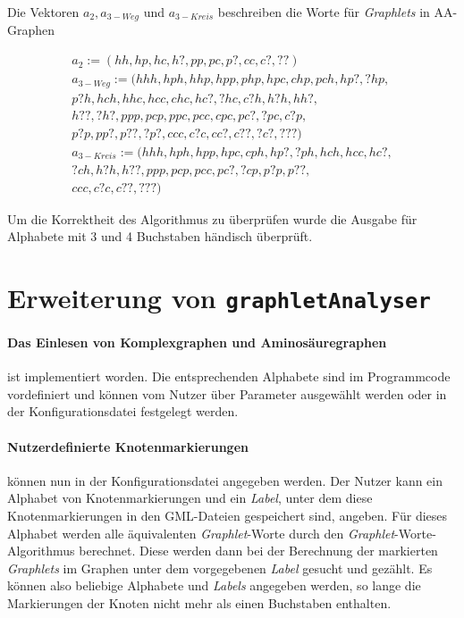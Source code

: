 \documentclass{report}
\begin{document}
Die Vektoren $a_2, a_{3-Weg}$ und $a_{3-Kreis}$ beschreiben die Worte f\"ur \textit{Graphlets} in AA-Graphen 

\begin{subequations}
\begin{align}
a_2 :=         (hh, hp, hc, h?, pp, pc, p?, cc, c?, ??) \\ 
a_{3-Weg} :=   (hhh, hph, hhp, hpp, php, hpc, chp, pch, hp?, ?hp,\\
                p?h, hch, hhc, hcc, chc, hc?, ?hc ,c?h, h?h, hh?, \\
                h??, ?h?, ppp, pcp, ppc, pcc, cpc, pc?, ?pc, c?p, \\
                p?p, pp?, p??, ?p?, ccc, c?c, cc?, c??, ?c?, ???) \\
a_{3-Kreis} := (hhh, hph, hpp, hpc, cph, hp?, ?ph, hch, hcc, hc?, \\
                ?ch, h?h, h??, ppp, pcp, pcc, pc?, ?cp, p?p, p??, \\
                ccc, c?c, c??, ???)
\end{align}
\end{subequations}


Um die Korrektheit des Algorithmus zu \"uberpr\"ufen wurde die Ausgabe f\"ur Alphabete mit 3 und 4 Buchstaben h\"andisch \"uberpr\"uft.



\section{Erweiterung von \texttt{graphletAnalyser}}

\paragraph{Das Einlesen von Komplexgraphen und Aminos\"auregraphen}

ist implementiert worden. Die entsprechenden Alphabete sind im Programmcode vordefiniert und k\"onnen vom Nutzer \"uber Parameter ausgew\"ahlt werden oder in der Konfigurationsdatei festgelegt werden.

\paragraph{Nutzerdefinierte Knotenmarkierungen} k\"onnen nun in der Konfigurationsdatei angegeben werden. Der Nutzer kann ein Alphabet von Knotenmarkierungen und ein \textit{Label}, unter dem diese Knotenmarkierungen in den GML-Dateien gespeichert sind, angeben. F\"ur dieses Alphabet werden alle \"aquivalenten \textit{Graphlet}-Worte durch den \textit{Graphlet}-Worte-Algorithmus berechnet. Diese werden dann bei der Berechnung der markierten \textit{Graphlets} im Graphen unter dem vorgegebenen \textit{Label} gesucht und gez\"ahlt.
Es k\"onnen also beliebige Alphabete und \textit{Labels} angegeben werden, so lange die Markierungen der Knoten nicht mehr als einen Buchstaben enthalten.
\end{document}
